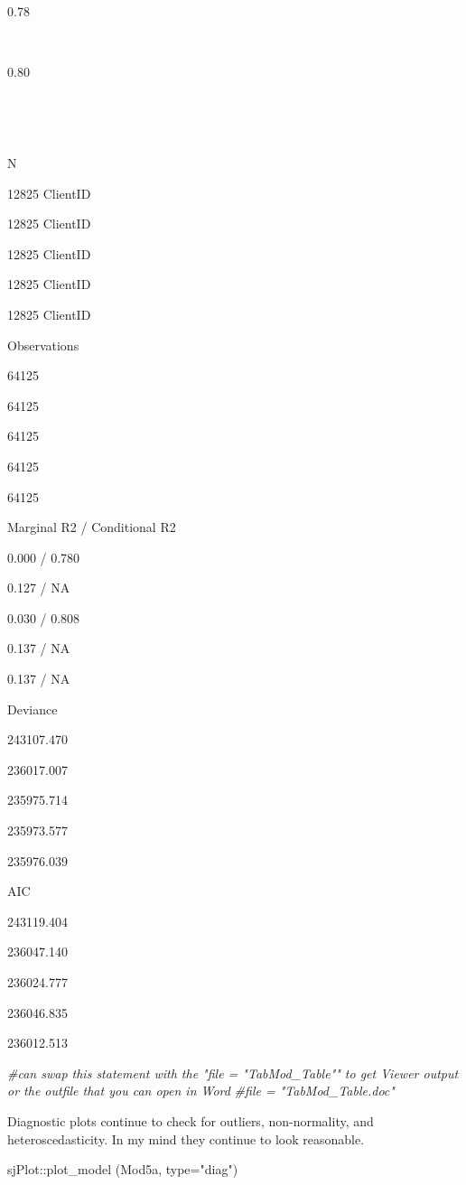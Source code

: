 \documentclass[
  11pt,
]{book}
\newenvironment{Shaded}{\begin{snugshade}}{\end{snugshade}}
\newcommand{\AttributeTok}[1]{\textcolor[rgb]{0.77,0.63,0.00}{#1}}
\newcommand{\CommentTok}[1]{\textcolor[rgb]{0.56,0.35,0.01}{\textit{#1}}}
\newcommand{\FunctionTok}[1]{\textcolor[rgb]{0.00,0.00,0.00}{#1}}
\newcommand{\NormalTok}[1]{#1}
\newcommand{\SpecialCharTok}[1]{\textcolor[rgb]{0.00,0.00,0.00}{#1}}
\newcommand{\StringTok}[1]{\textcolor[rgb]{0.31,0.60,0.02}{#1}}
\begin{document}
0.78

~

0.80

~

~

N

12825 ClientID

12825 ClientID

12825 ClientID

12825 ClientID

12825 ClientID

Observations

64125

64125

64125

64125

64125

Marginal R2 / Conditional R2

0.000 / 0.780

0.127 / NA

0.030 / 0.808

0.137 / NA

0.137 / NA

Deviance

243107.470

236017.007

235975.714

235973.577

235976.039

AIC

243119.404

236047.140

236024.777

236046.835

236012.513

\begin{Shaded}
\begin{Highlighting}[]
\CommentTok{\#can swap this statement with the "file = "TabMod\_Table"" to get Viewer output or the outfile that you can open in Word}
\CommentTok{\#file = "TabMod\_Table.doc"}
\end{Highlighting}
\end{Shaded}

Diagnostic plots continue to check for outliers, non-normality, and heteroscedasticity. In my mind they continue to look reasonable.

\begin{Shaded}
\begin{Highlighting}[]
\NormalTok{sjPlot}\SpecialCharTok{::}\FunctionTok{plot\_model}\NormalTok{ (Mod5a, }\AttributeTok{type=}\StringTok{"diag"}\NormalTok{)}
\end{Highlighting}
\end{Shaded}
\end{document}
